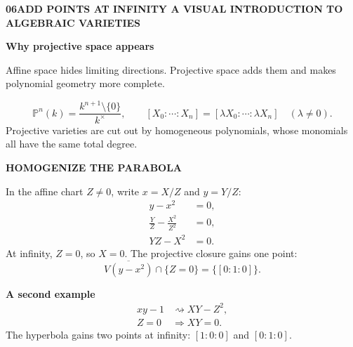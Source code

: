 \documentclass[9pt,a4paper]{extarticle}
\newcommand{\Pj}{\mathbb{P}}
\newcommand{\kk}{k}
\newcommand{\footertext}{ALGEBRAIC VARIETIES}
\newcommand{\pagehead}[3]{%
  {\fontsize{7.2}{8}\selectfont\bfseries\color{teal}#1\quad #2\hfill
   \normalfont\color{muted}A VISUAL INTRODUCTION TO ALGEBRAIC VARIETIES}\par
  \vspace{2.5pt}{\color{line}\hrule height 0.45pt}\vspace{8pt}
  {\fontsize{21}{23}\selectfont\bfseries\color{navy}#3}\par\vspace{5pt}}
\newcommand{\lead}[1]{{\fontsize{11.2}{15.2}\selectfont #1\par}\vspace{6pt}}
\newcommand{\eyebrow}[1]{{\fontsize{7.2}{8}\selectfont\bfseries\color{teal}\MakeUppercase{#1}}}
\begin{document}
\renewcommand{\footertext}{PROJECTIVE SPACE / HOMOGENIZATION / POINTS AT INFINITY}
\pagehead{06}{ADD POINTS AT INFINITY}{Why projective space appears}
\lead{Affine space hides limiting directions. Projective space adds them and makes polynomial geometry more complete.}

\begin{mathbox}
\[
\Pj^n(\kk)=\frac{\kk^{n+1}\setminus\{0\}}{\kk^\times},
\qquad
[X_0:\cdots:X_n]=[\lambda X_0:\cdots:\lambda X_n]\quad(\lambda\neq0).
\]
Projective varieties are cut out by homogeneous polynomials, whose monomials all have the same total degree.
\end{mathbox}

\vspace{5pt}
\begin{minipage}[t]{.47\textwidth}
\begin{quietbox}
\eyebrow{Homogenize the parabola}\par\vspace{4pt}
In the affine chart $Z\neq0$, write $x=X/Z$ and $y=Y/Z$:
\begin{align*}
y-x^2&=0,\\
\frac{Y}{Z}-\frac{X^2}{Z^2}&=0,\\
YZ-X^2&=0.
\end{align*}
At infinity, $Z=0$, so $X=0$. The projective closure gains one point:
\[
\overline{V(y-x^2)}\cap\{Z=0\}=\{[0:1:0]\}.
\]
\end{quietbox}
\end{minipage}\hfill
\begin{minipage}[t]{.49\textwidth}
\begin{center}
\end{center}
\begin{goldbox}
\textbf{A second example}
\begin{align*}
xy-1&\rightsquigarrow XY-Z^2,\\
Z=0&\Longrightarrow XY=0.
\end{align*}
The hyperbola gains two points at infinity: $[1:0:0]$ and $[0:1:0]$.
\end{goldbox}
\end{minipage}
\end{document}
